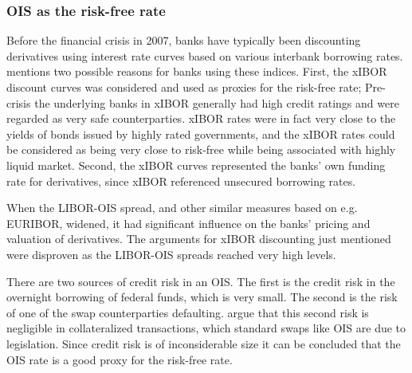 \documentclass[main.tex]{subfiles}
\begin{document}
    \subsubsection{OIS as the risk-free rate}
    
    Before the financial crisis in 2007, banks have typically been discounting
    derivatives using interest rate curves based on various interbank borrowing rates.
    \textcite[Section 8.6]{Green2015XVA} 
    mentions two possible reasons for banks using these indices.
    First, the xIBOR discount curves was considered and used as proxies for the risk-free rate;
    Pre-crisis the underlying banks in xIBOR generally had high credit ratings
    and were regarded as very safe counterparties.
    xIBOR rates were in fact very close to the yields of bonds issued by highly rated governments,
    and the xIBOR rates could be considered as being very close to risk-free 
    while being associated with highly liquid market.
    Second, the xIBOR curves represented the banks' own funding rate for derivatives, since
    xIBOR referenced unsecured borrowing rates.

    When the LIBOR-OIS spread, and other similar measures based on e.g. EURIBOR, widened, 
    it had significant influence on the banks' pricing and valuation of derivatives.
    The arguments for xIBOR discounting just mentioned
    were disproven as the LIBOR-OIS spreads reached very high levels.

    There are two sources of credit risk in an OIS.
    The first is the credit risk in the overnight borrowing of federal funds, which is very small. 
    The second is the risk of one of the swap counterparties defaulting.
    \textcite{HullWhiteOISvsLIBOR}
    argue that this second risk is negligible in collateralized transactions,
    which standard swaps like OIS are due to legislation.
    Since credit risk is of inconsiderable size it can be concluded 
    that the OIS rate is a good proxy for the risk-free rate.
\end{document}

